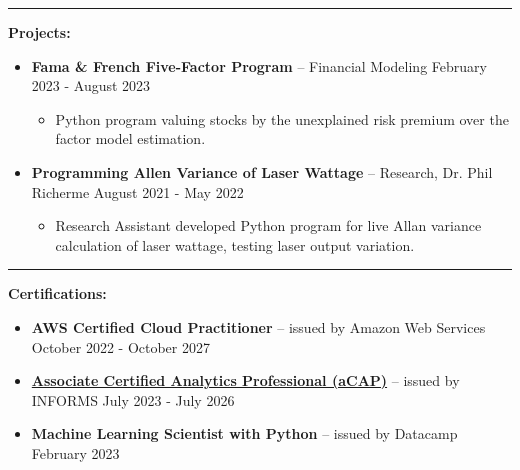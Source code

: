 \documentclass[letterpaper]{cream_class}
\begin{document}
  \hrule
  \vspace{6pt}
  
\noindent\textcolor{burgundy}{\noindent\textbf{\large Projects:}\\[-3ex]}
\begin{itemize}[noitemsep, leftmargin=*, itemsep=1pt]
    \item \textbf{\large Fama \& French Five-Factor Program} -- Financial Modeling \hfill February 2023 - August 2023
    \begin{itemize}[noitemsep, leftmargin=*, itemsep=1pt]
      \item Python program valuing stocks by the unexplained risk premium over the factor model estimation.
      \end{itemize}
    \item \textbf{\large Programming Allen Variance of Laser Wattage} -- Research, Dr. Phil Richerme \hfill August 2021 - May 2022
    \begin{itemize}[noitemsep, leftmargin=*, itemsep=1pt]
      \item Research Assistant developed Python program for live Allan variance calculation of laser wattage, testing laser output variation.
    \end{itemize}
\end{itemize}     
  \hrule
  \vspace{6pt}
  
\noindent\textcolor{burgundy}{\noindent\textbf{\large Certifications:}\\[-3ex]}
\begin{itemize}[noitemsep, leftmargin=*, itemsep=1pt]
  \item \textbf{\large AWS Certified Cloud Practitioner} -- issued by Amazon Web Services \hfill October 2022 - October 2027
  \item \textbf{\large \href{https://bcert.me/skzxpjuux}{Associate Certified Analytics Professional (aCAP)}} -- issued by INFORMS \hfill July 2023 - July 2026
  \item \textbf{\large Machine Learning Scientist with Python} -- issued by Datacamp \hfill February 2023
\end{itemize}     
\end{document}
